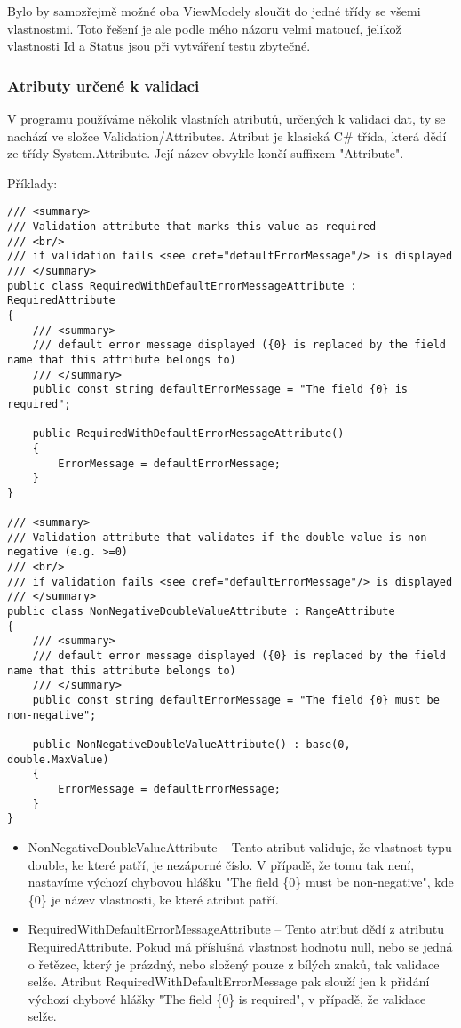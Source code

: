 Bylo by samozřejmě možné oba ViewModely sloučit do jedné třídy se všemi vlastnostmi. Toto řešení je ale podle mého názoru velmi matoucí, jelikož vlastnosti Id a Status jsou při vytváření testu zbytečné.

\subsubsection*{Atributy určené k validaci}

V programu používáme několik vlastních atributů, určených k validaci dat, ty se nachází ve složce Validation/Attributes.
Atribut je klasická C\# třída, která dědí ze třídy System.Attribute. Její název obvykle končí suffixem "Attribute".

Příklady:
\begin{lstlisting}
/// <summary>
/// Validation attribute that marks this value as required
/// <br/>
/// if validation fails <see cref="defaultErrorMessage"/> is displayed
/// </summary>
public class RequiredWithDefaultErrorMessageAttribute : RequiredAttribute
{
	/// <summary>
	/// default error message displayed ({0} is replaced by the field name that this attribute belongs to)
	/// </summary>
	public const string defaultErrorMessage = "The field {0} is required";
	
	public RequiredWithDefaultErrorMessageAttribute()
	{
		ErrorMessage = defaultErrorMessage;
	}
}

/// <summary>
/// Validation attribute that validates if the double value is non-negative (e.g. >=0)
/// <br/>
/// if validation fails <see cref="defaultErrorMessage"/> is displayed
/// </summary>
public class NonNegativeDoubleValueAttribute : RangeAttribute
{
	/// <summary>
	/// default error message displayed ({0} is replaced by the field name that this attribute belongs to)
	/// </summary>
	public const string defaultErrorMessage = "The field {0} must be non-negative";
	
	public NonNegativeDoubleValueAttribute() : base(0, double.MaxValue)
	{
		ErrorMessage = defaultErrorMessage;
	}
}
\end{lstlisting}

\begin{itemize}
\item NonNegativeDoubleValueAttribute -- Tento atribut validuje, že vlastnost typu double, ke které patří, je nezáporné číslo. V případě, že tomu tak není, nastavíme výchozí chybovou hlášku "The field \{0\} must be non-negative", kde \{0\} je název vlastnosti, ke které atribut patří.

\item RequiredWithDefaultErrorMessageAttribute -- Tento atribut dědí z atributu RequiredAttribute. Pokud má příslušná vlastnost hodnotu null, nebo se jedná o řetězec, který je prázdný, nebo složený pouze z bílých znaků, tak validace selže. Atribut RequiredWithDefaultErrorMessage pak slouží jen k přidání výchozí chybové hlášky "The field \{0\} is required", v případě, že validace selže.

\end{itemize}

